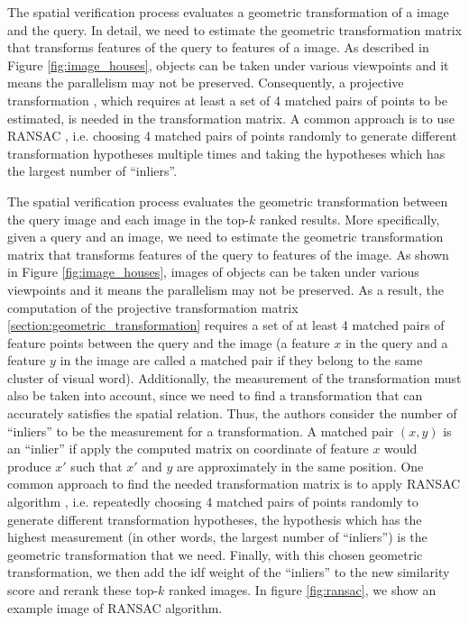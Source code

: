 The spatial verification process evaluates a geometric transformation of a image and the query. In detail, we need to estimate the geometric transformation matrix that transforms features of the query to features of a image. As described in Figure \ref{fig:image_houses}, objects can be taken under various viewpoints and it means the parallelism may not be preserved. Consequently, a projective transformation , which requires at least a set of 4 matched pairs of points to be estimated, is needed in the transformation matrix. A common approach is to use RANSAC \cite{Fischler1981}, i.e. choosing 4 matched pairs of points randomly to generate different transformation hypotheses multiple times and taking the hypotheses which has the largest number of \enquote{inliers}.

The spatial verification process evaluates the geometric transformation between the query image and each image in the top-$k$ ranked results. More specifically, given a query and an image, we need to estimate the geometric transformation matrix that transforms features of the query to features of the image. As shown in Figure \ref{fig:image_houses}, images of objects can be taken under various viewpoints and it means the parallelism may not be preserved. As a result, the computation of the projective transformation matrix \ref{section:geometric_transformation} requires a set of at least 4 matched pairs of feature points between the query and the image (a feature $x$ in the query and a feature $y$ in the image are called a matched pair if they belong to the same cluster of visual word). Additionally, the measurement of the transformation must also be taken into account, since we need to find a transformation that can accurately satisfies the spatial relation. Thus, the authors consider the number of \enquote{inliers} to be the measurement for a transformation. A matched pair $(x, y)$ is an \enquote{inlier} if apply the computed matrix on coordinate of feature $x$ would produce $x'$ such that $x'$ and $y$ are approximately in the same position. One common approach to find the needed transformation matrix is to apply RANSAC algorithm \cite{Fischler1981}, i.e. repeatedly choosing 4 matched pairs of points randomly to generate different transformation hypotheses, the hypothesis which has the highest measurement (in other words, the largest number of \enquote{inliers}) is the geometric transformation that we need. Finally, with this chosen geometric transformation, we then add the idf weight of the \enquote{inliers} to the new similarity score and rerank these top-$k$ ranked images. In figure \ref{fig:ransac}, we show an example image of RANSAC algorithm.

